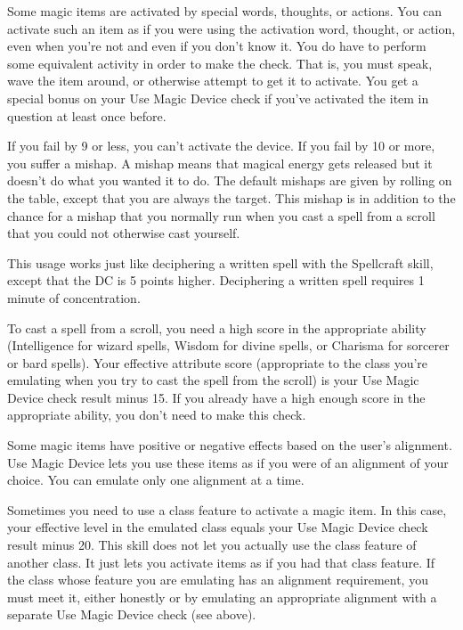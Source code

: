  Some magic items are activated by special words, thoughts, or actions. You can activate such an item as if you were using the activation word, thought, or action, even when you're not and even if you don't know it. You do have to perform some equivalent activity in order to make the check. That is, you must speak, wave the item around, or otherwise attempt to get it to activate. You get a special  bonus on your Use Magic Device check if you've activated the item in question at least once before.

If you fail by 9 or less, you can't activate the device. If you fail by 10 or more, you suffer a mishap. A mishap means that magical energy gets released but it doesn't do what you wanted it to do. The default mishaps are given by rolling on the  table, except that you are always the target. This mishap is in addition to the chance for a mishap that you normally run when you cast a spell from a scroll that you could not otherwise cast yourself.

 This usage works just like deciphering a written spell with the Spellcraft skill, except that the DC is 5 points higher. Deciphering a written spell requires 1 minute of concentration.

 To cast a spell from a scroll, you need a high score in the appropriate ability (Intelligence for wizard spells, Wisdom for divine spells, or Charisma for sorcerer or bard spells). Your effective attribute score (appropriate to the class you're emulating when you try to cast the spell from the scroll) is your Use Magic Device check result minus 15. If you already have a high enough score in the appropriate ability, you don't need to make this check.

 Some magic items have positive or negative effects based on the user's alignment. Use Magic Device lets you use these items as if you were of an alignment of your choice. You can emulate only one alignment at a time.

 Sometimes you need to use a class feature to activate a magic item. In this case, your effective level in the emulated class equals your Use Magic Device check result minus 20.  This skill does not let you actually use the class feature of another class. It just lets you activate items as if you had that class feature. If the class whose feature you are emulating has an alignment requirement, you must meet it, either honestly or by emulating an appropriate alignment with a separate Use Magic Device check (see above).

